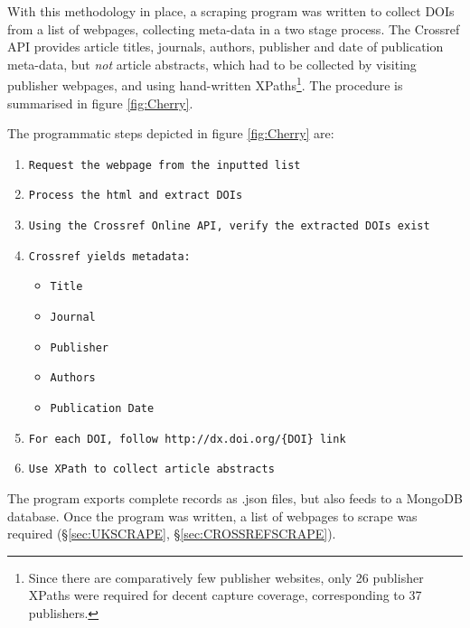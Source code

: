 With this methodology in place, a scraping program was written to collect DOIs from a list of webpages, collecting meta-data in a two stage process. The Crossref API provides article titles, journals, authors, publisher and date of publication meta-data, but \emph{not} article abstracts, which had to be collected by visiting publisher webpages, and using hand-written XPaths\footnote{Since there are comparatively few publisher websites, only 26 publisher XPaths were required for decent capture coverage, corresponding to 37 publishers.}. The procedure is summarised in figure \ref{fig:Cherry}.

The programmatic steps depicted in figure \ref{fig:Cherry} are:
\begin{enumerate}
\itemsep-0.5em 
\item \texttt{Request the webpage from the inputted list}
\item \texttt{Process the html and extract DOIs}
\item \texttt{Using the Crossref Online API, verify the extracted DOIs exist}
\item \texttt{Crossref yields metadata:}
\begin{itemize}
\itemsep-0.5em 
\item \texttt{Title}
\item \texttt{Journal}
\item \texttt{Publisher}
\item \texttt{Authors}
\item \texttt{Publication Date}
\end{itemize}
\item \texttt{For each DOI,  follow \texttt{http://dx.doi.org/\{DOI\}} link}
\item \texttt{Use XPath to collect article abstracts}
\end{enumerate}
The program exports complete records as .json files, but also feeds to a MongoDB database. Once the program was written, a list of webpages to scrape was required (\S\ref{sec:UKSCRAPE}, \S\ref{sec:CROSSREFSCRAPE}).
